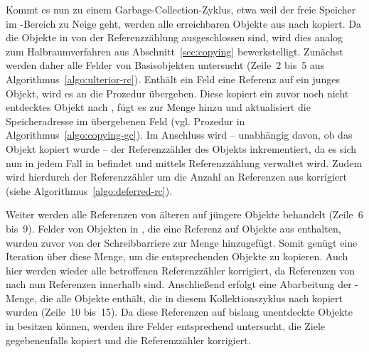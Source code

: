 Kommt es nun zu einem Garbage-Collection-Zyklus, etwa weil der freie Speicher im \Nursery-Bereich zu Neige geht, werden alle erreichbaren Objekte aus \Nursery nach \Mature kopiert.
Da die Objekte in \Nursery von der Referenzzählung ausgeschlossen sind, wird dies analog zum Halbraumverfahren aus Abschnitt~\ref{sec:copying} bewerkstelligt.
Zunächst werden daher alle Felder von Basisobjekten untersucht (Zeile~2 bis~5 aus Algorithmus~\ref{algo:ulterior-rc}).
Enthält ein Feld eine Referenz auf ein junges Objekt, wird es an die Prozedur  übergeben.
Diese kopiert ein zuvor noch nicht entdecktes Objekt nach \Mature, fügt es zur Menge  hinzu und aktualisiert die Speicheradresse im übergebenen Feld (vgl. Prozedur  in Algorithmus~\ref{algo:copying-gc}).
Im Anschluss wird -- unabhängig davon, ob das Objekt kopiert wurde -- der Referenzzähler des Objekts inkrementiert, da es sich nun in jedem Fall in \Mature befindet und mittels Referenzzählung verwaltet wird.
Zudem wird hierdurch der Referenzzähler um die Anzahl an Referenzen aus \Roots korrigiert (siehe Algorithmus~\ref{algo:deferred-rc}).

Weiter werden alle Referenzen von älteren auf jüngere Objekte behandelt (Zeile~6 bis~9).
Felder von Objekten in \Mature, die eine Referenz auf Objekte aus \Nursery enthalten, wurden zuvor von der Schreibbarriere zur Menge  hinzugefügt.
Somit genügt eine Iteration über diese Menge, um die entsprechenden Objekte zu kopieren.
Auch hier werden wieder alle betroffenen Referenzzähler korrigiert, da Referenzen von \Mature nach \Nursery nun Referenzen innerhalb \Mature sind.
Anschließend erfolgt eine Abarbeitung der -Menge, die alle Objekte enthält, die in diesem Kollektionszyklus nach \Mature kopiert wurden (Zeile~10 bis~15).
Da diese Referenzen auf bislang unentdeckte Objekte in \Nursery besitzen können, werden ihre Felder entsprechend untersucht, die Ziele gegebenenfalls kopiert und die Referenzzähler korrigiert.

